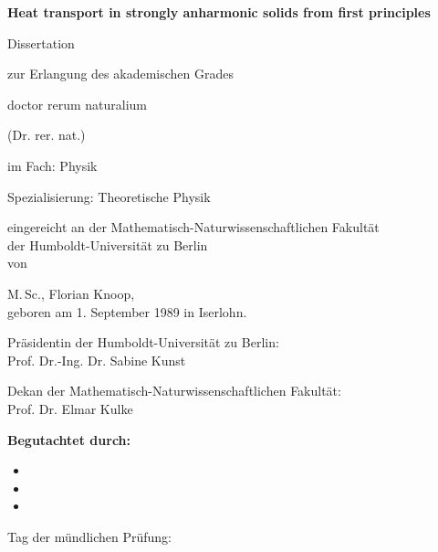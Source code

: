 \thispagestyle{empty}

\begin{fullwidth}
  \begin{center}
  \LARGE
  \textbf{Heat transport in strongly anharmonic solids from first principles}
  \\ \vspace{3em}
  
  \Large
  Dissertation 
  
  zur Erlangung des akademischen Grades 
  
  doctor rerum naturalium
  
  (Dr. rer. nat.)
  
  \vspace{3em}
    
  im Fach: Physik

Spezialisierung: Theoretische Physik 

\vspace{3em}

eingereicht an der Mathematisch-Naturwissenschaftlichen Fakultät \\
der Humboldt-Universität zu Berlin \\
von 

\vspace{3em} 

M.\,Sc., Florian Knoop, \\
geboren am 1. September 1989 in Iserlohn.

\vspace{3em}

Präsidentin der Humboldt-Universität zu Berlin: \\ Prof. Dr.-Ing. Dr. Sabine Kunst 

\vspace{3em}

Dekan der Mathematisch-Naturwissenschaftlichen Fakultät: \\ Prof. Dr. Elmar Kulke

\vspace{3em}

\vfill
\textbf{Begutachtet durch:}

\vspace{2em}

\begin{itemize}
  \setlength\itemsep{1em}
  \item 
  \item 
  \item 
\end{itemize}

\vspace{2em}

\flushleft Tag der mündlichen Prüfung:

\end{center}
\end{fullwidth}
